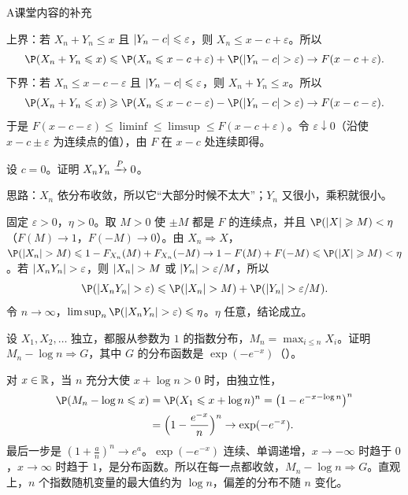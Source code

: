 \begin{exercises}{A}{课堂内容的补充}
\begin{questions}
\begin{solution}
上界：若 $X_n+Y_n\leqslant x$ 且 $\lvert Y_n-c\rvert\leqslant\varepsilon$，则 $X_n\leqslant x-c+\varepsilon$。所以
\[
\P(X_n+Y_n\leqslant x)\leqslant \P(X_n\leqslant x-c+\varepsilon)+\P(\abs{Y_n-c}>\varepsilon)\to F(x-c+\varepsilon).
\]
下界：若 $X_n\leqslant x-c-\varepsilon$ 且 $\lvert Y_n-c\rvert\leqslant\varepsilon$，则 $X_n+Y_n\leqslant x$。所以
\[
\P(X_n+Y_n\leqslant x)\geqslant \P(X_n\leqslant x-c-\varepsilon)-\P(\abs{Y_n-c}>\varepsilon)\to F(x-c-\varepsilon).
\]
于是 $F(x-c-\varepsilon)\leqslant\liminf\leqslant\limsup\leqslant F(x-c+\varepsilon)$。令 $\varepsilon\downarrow0$（沿使 $x-c\pm\varepsilon$ 为连续点的值），由 $F$ 在 $x-c$ 处连续即得。
\end{solution}
\item 设 $c=0$。证明 $X_nY_n\xrightarrow{P}0$。
\begin{solution}
思路：$X_n$ 依分布收敛，所以它“大部分时候不太大”；$Y_n$ 又很小，乘积就很小。

固定 $\varepsilon>0$，$\eta>0$。取 $M>0$ 使 $\pm M$ 都是 $F$ 的连续点，并且 $\P(\abs X\geqslant M)<\eta$（$F(M)\to1$，$F(-M)\to0$）。由 $X_n\Rightarrow X$，$\P(\abs{X_n}>M)\leqslant1-F_{X_n}(M)+F_{X_n}(-M)\to1-F(M)+F(-M)\leqslant \P(\abs X\geqslant M)<\eta$。若 $\lvert X_nY_n\rvert>\varepsilon$，则 $\lvert X_n\rvert>M$ 或 $\lvert Y_n\rvert>\varepsilon/M$，所以
\[
\P(\abs{X_nY_n}>\varepsilon)\leqslant \P(\abs{X_n}>M)+\P(\abs{Y_n}>\varepsilon/M).
\]
令 $n\to\infty$，$\limsup_n\P(\abs{X_nY_n}>\varepsilon)\leqslant\eta$。$\eta$ 任意，结论成立。
\end{solution}
\end{questions}

\item\label{ex:convergence:A3} 设 $X_1,X_2,\dots$ 独立，都服从参数为 $1$ 的指数分布，$M_n=\max_{i\leqslant n}X_i$。证明 $M_n-\log n\Rightarrow G$，其中 $G$ 的分布函数是 $\exp(-e^{-x})$（）。
\begin{solution}
对 $x\in\mathbb{R}$，当 $n$ 充分大使 $x+\log n>0$ 时，由独立性，
\[
\begin{aligned}
\P(M_n-\log n\leqslant x)&=\P(X_1\leqslant x+\log n)^n=\bigl(1-e^{-x-\log n}\bigr)^n\\
&=\Bigl(1-\frac{e^{-x}}n\Bigr)^n\to\exp(-e^{-x}).
\end{aligned}
\]
最后一步是 $(1+\frac an)^n\to e^a$。$\exp(-e^{-x})$ 连续、单调递增，$x\to-\infty$ 时趋于 $0$，$x\to\infty$ 时趋于 $1$，是分布函数。所以在每一点都收敛，$M_n-\log n\Rightarrow G$。直观上，$n$ 个指数随机变量的最大值约为 $\log n$，偏差的分布不随 $n$ 变化。
\end{solution}


\end{exercises}
